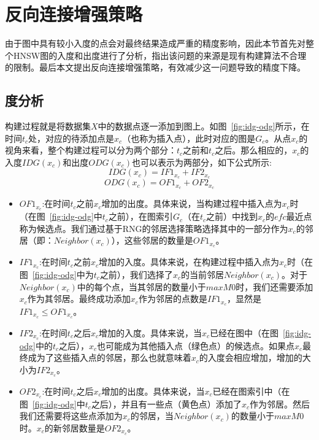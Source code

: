 \section{反向连接增强策略}\label{sec:galg-connection}
由于图中具有较小入度的点会对最终结果造成严重的精度影响，因此本节首先对整个HNSW图的入度和出度进行了分析，指出该问题的来源是现有构建算法不合理的限制。最后本文提出反向连接增强策略，有效减少这一问题导致的精度下降。

\subsection{度分析}
构建过程就是将数据集$X$中的数据点逐一添加到图上。如图~\ref{fig:idg-odg}所示，在时间$t_c$处，对应的待添加点是$x_c$（也称为插入点），此时对应的图是$G_c$。从点$x_c$的视角来看，整个构建过程可以分为两个部分：$t_c$之前和$t_c$之后。那么相应的，$x_c$的入度$IDG(x_c)$和出度$ODG(x_c)$也可以表示为两部分，如下公式所示:
\begin{equation}
  IDG(x_c) = IF1_{x_c} + IF2_{x_c}
\end{equation}
\begin{equation}
  ODG(x_c) = OF1_{x_c} + OF2_{x_c}
\end{equation}

\begin{itemize}
  \item $OF1_{x_c}$:在时间$t_c$之前$x_c$增加的出度。具体来说，当构建过程中插入点为$x_c$时（在图~\ref{fig:idg-odg}中$t_c$之前），在图索引$G_c$（在$t_c$之前）中找到$x_c$的$efc$最近点称为候选点。我们通过基于RNG的邻居选择策略选择其中的一部分作为$x_c$的邻居（即：$Neighbor(x_c)$），这些邻居的数量是$OF1_{x_c}$。
  \item $IF1_{x_c}$:在时间$t_c$之前$x_c$增加的入度。具体来说，在构建过程中插入点为$x_c$时（在图~\ref{fig:idg-odg}中为$t_c$之前），我们选择了$x_c$的当前邻居$Neighbor(x_c)$。对于$Neighbor(x_c)$中的每个点，当其邻居的数量小于$maxM0$时，我们还需要添加$x_c$作为其邻居。最终成功添加$x_c$作为邻居的点数是$IF1_{x_c}$，显然是$IF1_{x_c} \leq OF1_{x_c}$。
  \item $IF2_{x_c}$:在时间$t_c$之后$x_c$增加的入度。具体来说，当$x_c$已经在图中（在图~\ref{fig:idg-odg}中的$t_c$之后），$x_c$也可能成为其他插入点（绿色点）的候选点。如果点$x_c$最终成为了这些插入点的邻居，那么也就意味着$x_c$的入度会相应增加，增加的大小为$IF2_{x_c}$。
  \item $OF2_{x_c}$:在时间$t_c$之后$x_c$增加的出度。具体来说，当$x_c$已经在图索引中（在图~\ref{fig:idg-odg}中$t_c$之后），并且有一些点（黄色点）添加了$x_c$作为邻居。然后我们还需要将这些点添加为$x_c$的邻居，当$Neighbor(x_c)$的数量小于$maxM0$时。$x_c$的新邻居数量是$OF2_{x_c}$。
\end{itemize}

